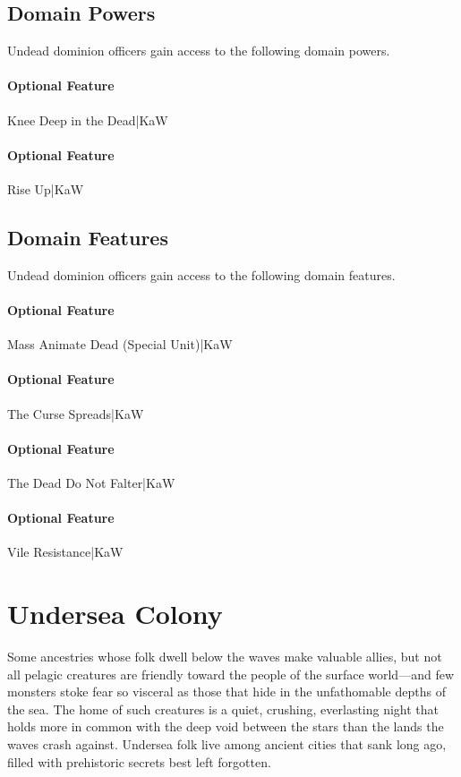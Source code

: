 \documentclass[10pt,a4paper,twoside,bg=print,twocolumn,openany,nodeprecatedcode]{dndbook}
\begin{document}
\subsection{Domain Powers}
Undead dominion officers gain access to the following domain powers.

\paragraph{Optional Feature}
Knee Deep in the Dead|KaW

\paragraph{Optional Feature}
Rise Up|KaW

\subsection{Domain Features}
Undead dominion officers gain access to the following domain features.

\paragraph{Optional Feature}
Mass Animate Dead (Special Unit)|KaW

\paragraph{Optional Feature}
The Curse Spreads|KaW

\paragraph{Optional Feature}
The Dead Do Not Falter|KaW

\paragraph{Optional Feature}
Vile Resistance|KaW

\section{Undersea Colony}
Some ancestries whose folk dwell below the waves make valuable allies, but not all pelagic creatures are friendly toward the people of the surface world—and few monsters stoke fear so visceral as those that hide in the unfathomable depths of the sea. The home of such creatures is a quiet, crushing, everlasting night that holds more in common with the deep void between the stars than the lands the waves crash against. Undersea folk live among ancient cities that sank long ago, filled with prehistoric secrets best left forgotten.
\end{document}
